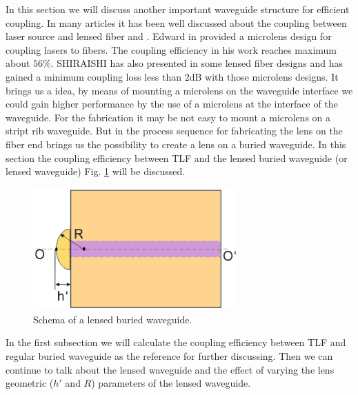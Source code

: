 In this section we will discuss another important waveguide structure for efficient coupling. In many articles it has been well discussed about the coupling between laser source and lensed fiber\cite{microlensese_to_fiber_coupling} and \cite{integrated_coupling _between_LD_SMF}.  Edward in \cite{microlensese_to_fiber_coupling} provided a microlens design for coupling lasers to fibers. The coupling efficiency in his work reaches maximum about $56\%$. SHIRAISHI has also presented in \cite{integrated_coupling _between_LD_SMF} some lensed fiber designs and has gained a minimum coupling loss less than $2$dB with those microlens designs. It brings us a idea, by means of mounting a microlens on the waveguide interface we could gain higher performance by the use of a microlens at the interface of the waveguide. For the fabrication it may be not easy to mount a microlens on a stript rib waveguide. But in \cite{lens_end_manufacture} the process sequence for fabricating the lens on the fiber end brings us the possibility to create a lens on a buried waveguide. In this section the coupling efficiency between TLF and the lensed buried waveguide (or lensed waveguide) Fig. \ref{fig:lensed_waveguide} will be discussed.\\

\begin{figure}[!ht]
\centering
\includegraphics[width=0.7\textwidth]{bilder/lensed_waveguide}
\caption{Schema of a lensed buried waveguide.}
\label{fig:lensed_waveguide}
\end{figure}
In the first subsection we will calculate the coupling efficiency between TLF and regular buried waveguide as the reference for further discussing. Then we can continue to talk about the lensed waveguide and the effect of varying the lens geometric ($h'$ and $R$) parameters of the lensed waveguide. \\

